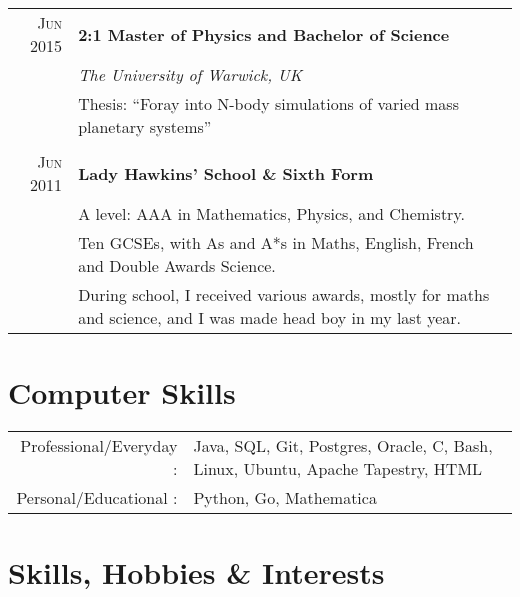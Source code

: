 \documentclass[a4paper,10pt]{article} %
\begin{document}
\begin{tabular}{r|p{16cm}}
\textsc{Jun 2015} & \textbf{2:1 Master of Physics and Bachelor of Science}\\
\textsc{} & \emph{The University of Warwick, UK} \\
\textsc{} & Thesis: ``Foray into N-body simulations of varied mass planetary systems'' \\
\multicolumn{2}{c}{} \\


\textsc{Jun 2011} & \textbf{Lady Hawkins’ School \& Sixth Form} \\
\textsc{} & \footnotesize{A level: AAA in Mathematics, Physics, and Chemistry.} \\
\textsc{} & \footnotesize{Ten GCSEs, with As and A*s in Maths, English, French and Double Awards Science.} \\
\textsc{} & \footnotesize{During school, I received various awards, mostly for maths and science, and I was made head boy in my last year.} \\
\end{tabular}


\section{Computer Skills}

\begin{tabular}{rp{15cm}}
Professional/Everyday : & Java, SQL, Git, Postgres, Oracle, C, Bash, Linux, Ubuntu, Apache Tapestry, HTML\\
Personal/Educational : & Python, Go, Mathematica\\
\end{tabular}


\section{Skills, Hobbies \& Interests}
\end{document}
